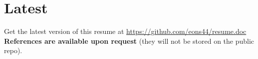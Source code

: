 \documentclass[letterpaper]{twentysecondcv} %
\begin{document}

\section{Latest}

Get the latest version of this resume at \href{https://github.com/eons44/resume.doc}{https://github.com/eons44/resume.doc}\\
\textbf{References are available upon request} (they will not be stored on the public repo).
\end{document}
